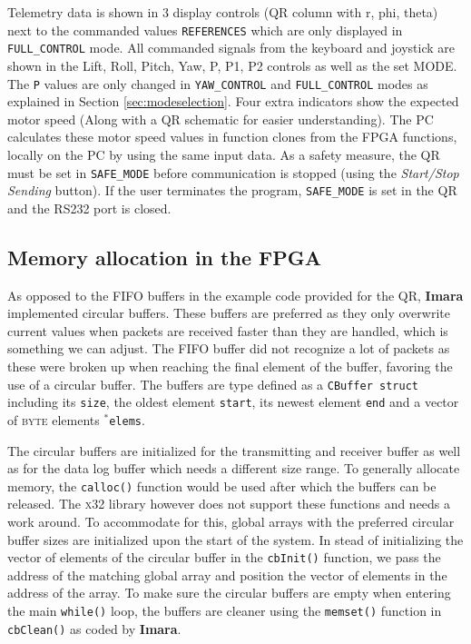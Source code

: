 \documentclass{article}
\begin{document}
Telemetry data is shown in 3 display controls (QR column with r, phi, theta) next to the commanded values \texttt{REFERENCES} which are only displayed in \texttt{FULL\_CONTROL} mode. All commanded signals from the keyboard and joystick are shown in the Lift, Roll, Pitch, Yaw, P, P1, P2 controls as well as the set MODE. The \texttt{P} values are only changed in \texttt{YAW\_CONTROL} and \texttt{FULL\_CONTROL} modes as explained in Section \ref{sec:modeselection}. Four extra indicators show the expected motor speed (Along with a QR schematic for easier understanding). The PC calculates these motor speed values in function clones from the FPGA functions, locally on the PC by using the same input data. As a safety measure, the QR must be set in \texttt{SAFE\_MODE} before communication is stopped (using the \emph{Start/Stop Sending} button). If the user terminates the program, \texttt{SAFE\_MODE} is set in the QR and the RS232 port is closed.


\subsection{Memory allocation in the FPGA}
As opposed to the FIFO buffers in the example code provided for the QR, \textbf{Imara} implemented circular buffers. These buffers are preferred as they only overwrite current values when packets are received faster than they are handled, which is something we can adjust. The FIFO buffer did not recognize a lot of packets as these were broken up when reaching the final element of the buffer, favoring the use of a circular buffer. The buffers are type defined as a \texttt{CBuffer struct} including its \texttt{size}, the oldest element \texttt{start}, its newest element \texttt{end} and a vector of \textsc{byte} elements \texttt{$^*$elems}.

The circular buffers are initialized for the transmitting and receiver buffer as well as for the data log buffer which needs a different size range. To generally allocate memory, the \texttt{calloc()} function would be used after which the buffers can be released. The \textsc{x32} library however does not support these functions and needs a work around. To accommodate for this, global arrays with the preferred circular buffer sizes are initialized upon the start of the system. In stead of initializing the vector of elements of the circular buffer in the \texttt{cbInit()} function, we pass the address of the matching global array and position the vector of elements in the address of the array.  To make sure the circular buffers are empty when entering the main \texttt{while()} loop, the buffers are cleaner using the \texttt{memset()} function in \texttt{cbClean()} as coded by \textbf{Imara}.
\end{document}
